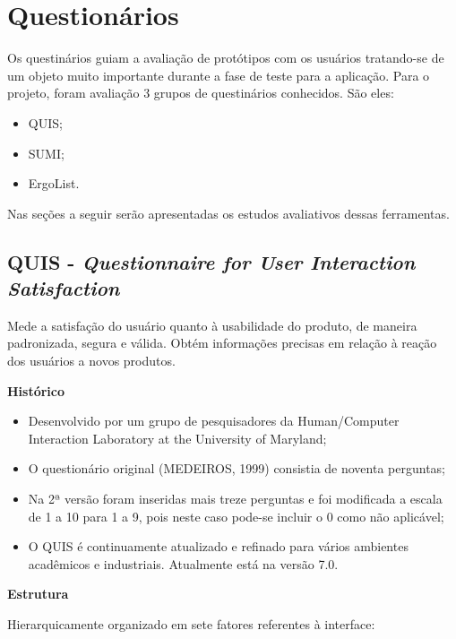 \chapter[Questionários]{Questionários}
\label{chap:questionarios}
	
	Os questinários guiam a avaliação de protótipos com os usuários tratando-se de um objeto muito importante durante a fase de teste para a aplicação. Para o projeto, foram avaliação 3 grupos de questinários conhecidos. São eles:

	\begin{itemize}
			\item{QUIS;}
			\item{SUMI;}
			\item{ErgoList.}
		\end{itemize}

	Nas seções a seguir serão apresentadas os estudos avaliativos dessas ferramentas.

	\section[QUIS]{QUIS - \emph{Questionnaire for User Interaction Satisfaction}}
	\label{sec:questionarios_QUIS}

		Mede a satisfação do usuário quanto à usabilidade do produto, de maneira padronizada, segura e válida. Obtém informações precisas em relação à reação dos usuários a novos produtos. 

		\textbf{Histórico}

		\begin{itemize}
			\item{Desenvolvido por um grupo de pesquisadores da Human/Computer Interaction Laboratory at the University of Maryland;}
			\item{O questionário original (MEDEIROS, 1999) consistia de noventa perguntas;}
			\item{Na 2ª versão foram inseridas mais treze perguntas e foi modificada a escala de 1 a 10 para 1 a 9, pois neste caso pode-se incluir o 0 como não aplicável;}
			\item{O QUIS é continuamente atualizado e refinado para vários ambientes acadêmicos e industriais. Atualmente está na versão 7.0.}
		\end{itemize}

		\textbf{Estrutura}

		Hierarquicamente organizado em sete fatores referentes à interface: 

